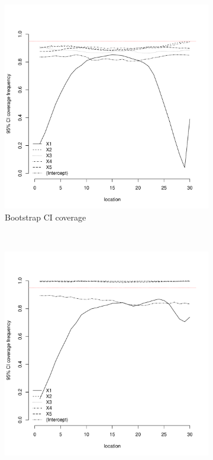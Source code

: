 \documentclass[authoryear, review, 11pt]{elsarticle}
\begin{document}
\begin{figure}
	\vspace{-30mm}
	\centering
	\begin{subfigure}[b]{0.45\textwidth}
	\centering
		\includegraphics[width=\textwidth]{../../figures/simulation/15.2.profile_bootstrap_coverage.pdf}
		\caption{Bootstrap CI coverage}
	\end{subfigure}%
	~ %
	\begin{subfigure}[b]{0.45\textwidth}
	\centering
		\includegraphics[width=\textwidth]{../../figures/simulation/15.2.profile_se_coverage.pdf}

\end{subfigure}
\end{figure}
\end{document}
